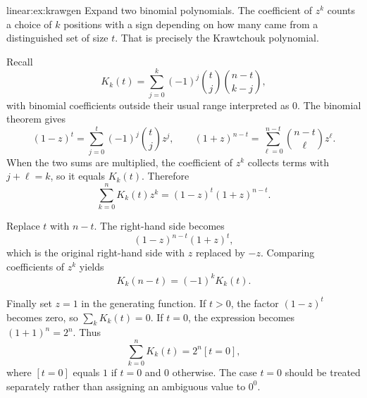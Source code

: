 \begin{solution}{linear:ex:krawgen}
\idea Expand two binomial polynomials. The coefficient of $z^k$ counts a choice of $k$ positions with a sign depending on how many came from a distinguished set of size $t$. That is precisely the Krawtchouk polynomial.

\writeup Recall
\[
K_k(t)=\sum_{j=0}^k(-1)^j
\binom tj\binom{n-t}{k-j},
\]
with binomial coefficients outside their usual range interpreted as $0$. The binomial theorem gives
\[
(1-z)^t=\sum_{j=0}^t(-1)^j\binom tjz^j,
\qquad
(1+z)^{n-t}=\sum_{\ell=0}^{n-t}\binom{n-t}{\ell}z^\ell.
\]
When the two sums are multiplied, the coefficient of $z^k$ collects terms with $j+\ell=k$, so it equals $K_k(t)$. Therefore
\[
\boxed{\sum_{k=0}^nK_k(t)z^k=(1-z)^t(1+z)^{n-t}}.
\]

Replace $t$ with $n-t$. The right-hand side becomes
\[
(1-z)^{n-t}(1+z)^t,
\]
which is the original right-hand side with $z$ replaced by $-z$. Comparing coefficients of $z^k$ yields
\[
\boxed{K_k(n-t)=(-1)^kK_k(t)}.
\]

Finally set $z=1$ in the generating function. If $t>0$, the factor $(1-z)^t$ becomes zero, so $\sum_kK_k(t)=0$. If $t=0$, the expression becomes $(1+1)^n=2^n$. Thus
\[
\boxed{\sum_{k=0}^nK_k(t)=2^n[t=0]},
\]
where $[t=0]$ equals $1$ if $t=0$ and $0$ otherwise. The case $t=0$ should be treated separately rather than assigning an ambiguous value to $0^0$.
\end{solution}

